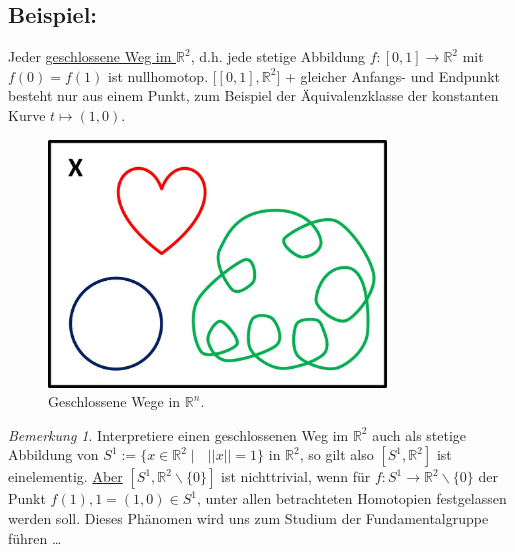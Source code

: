 \documentclass[a4paper,11pt,notitlepage]{report}
\theoremstyle{remark}
\newtheorem{remark}{Bemerkung}[chapter]
\theoremstyle{definition}
\newcommand{\R}{{\ensuremath{\mathbb{R}}}}
\newenvironment{bsp}[1]
{
\setlength{\fboxsep}{10pt}
\subsection*{Beispiel: #1}
\begin{upshape}
}
{
\end{upshape}
}
\begin{document}
\begin{bsp}{}
Jeder \underline{geschlossene Weg im $\R^2$}, d.h. jede stetige Abbildung $f \colon [0,1] \rightarrow \R^2$ mit $f(0) = f(1)$ ist nullhomotop.
$\bigl[[0,1], \R^2\bigr]$ + gleicher Anfangs- und Endpunkt besteht nur aus einem Punkt, zum Beispiel der Äquivalenzklasse der konstanten Kurve $t \mapsto (1,0)$.

\begin{figure}[h]
\centering
\includegraphics[width=0.8\textwidth]{images/Geschlossene_Wege.jpg}
\caption{Geschlossene Wege in $\R^n$.}
\end{figure}

\begin{remark}{}\label{nichttrivial}
Interpretiere einen geschlossenen Weg im $\R^2$ auch als stetige Abbildung von $S^1 := \{ x \in \R^2 \mid \text{ } ||x|| = 1\}$ in $\R^2$, so gilt also $[S^1, \R^2]$ ist einelementig.
\newline
\underline{Aber} $[S^1, \R^2 \backslash \{0\}]$ ist nichttrivial, wenn für $f \colon S^1 \rightarrow \R^2 \backslash \{0\}$ der Punkt $f(1), 1 = (1,0) \in S^1$, unter allen betrachteten Homotopien festgelassen werden soll. Dieses Phänomen wird uns zum Studium der Fundamentalgruppe führen \ldots
\end{remark}


\end{bsp}
\end{document}
